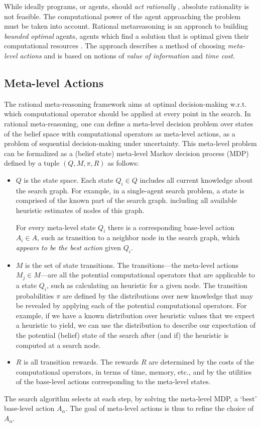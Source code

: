 While ideally programs, or agents, should {\em act rationally}
\cite{Russell.aima}, absolute rationality is not feasible. The
computational power of the agent approaching the problem must be taken
into account. Rational metareasoning \cite{Russell.right} is an
approach to building {\em bounded optimal} agents, agents which find a
solution that is optimal given their computational resources
\cite{Horvitz.reasoningabout}. The approach describes a method of
choosing {\em meta-level actions} and is based on notions of {\em
value of information} and {\em time cost}.

\subsection{Meta-level Actions}

The rational meta-reasoning framework aims at optimal
decision-making w.r.t. which computational operator should be applied
at every point in the search. In rational meta-reasoning, one can
define a meta-level decision problem over states of the belief space
with computational operators as meta-level actions, as a problem of
sequential decision-making under uncertainty. This meta-level problem
can be formalized as a (belief state) meta-level Markov decision
process (MDP) defined by a tuple $(Q, M, \pi, R)$ as follows:
\begin{itemize}
\item $Q$ is the state space. Each state $Q_i \in Q$ includes all
current knowledge about the search graph. For example, in a
single-agent search problem, a state is comprised of the known part of
the search graph. including all available heuristic estimates of nodes
of this graph. 

For every meta-level state $Q_i$ there is a
corresponding base-level action $A_i \in A$, such as transition to a
neighbor node in the search graph, which \textit{appears to be the best action}
given $Q_i$.

\item $M$ is the set of state transitions. The transitions---the
meta-level actions $M_j \in M$---are all the potential computational
operators that are applicable to a state $Q_i$, such as calculating an
heuristic for a given node. The transition probabilities $\pi$ are
defined by the distributions over new knowledge that may be revealed
by applying each of the potential computational operators.  For
example, if we have a known distribution over heuristic values that we
expect a heuristic to yield, we can use the distribution to describe
our expectation of the potential (belief) state of the search after
(and if) the heuristic is computed at a search node.

\item $R$ is all transition rewards. The rewards $R$ are determined by the 
costs of the computational operators, in terms of time, memory,
etc., and by the utilities of the base-level actions corresponding to
the meta-level states.  
\end{itemize}
The search algorithm selects at each step, by solving
the meta-level MDP, a `best' base-level action $A_\alpha$.
The goal of meta-level actions is thus to refine the choice of
$A_\alpha$.

